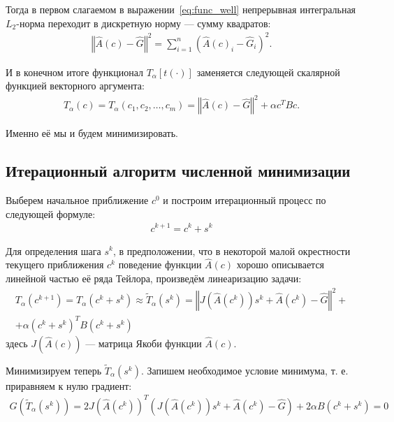 \documentclass[a4paper,14pt]{extarticle}
\newcommand{\norm}[1]{\left\Vert #1 \right\Vert}
\begin{document}
    Тогда в первом слагаемом в выражении~\eqref{eq:func_well} непрерывная интегральная $L_2$-норма переходит в дискретную норму --- сумму квадратов:
    \begin{gather*}
        \norm{\hat{A}(c) - \hat{G}}^2
        = \sum_{i = 1}^n \left(
        \hat{A}(c)_i
        - \hat{G}_i
        \right)^2.
    \end{gather*}

    И в конечном итоге функционал $T_{\alpha}[t(\cdot)]$ заменяется следующей скалярной функцией векторного аргумента:
    \begin{gather}
        \label{eq:func_discr}
        T_{\alpha}(c)
        = T_{\alpha}(c_1, c_2, \ldots, c_m)
        = \norm{\hat{A}(c) - \hat{G}}^2
        + \alpha  c^{T} B c.
    \end{gather}

    Именно её мы и будем минимизировать.

    \subsection{Итерационный алгоритм численной минимизации}

    Выберем начальное приближение $c^0$ и построим итерационный процесс по следующей формуле:
    \begin{gather*}
        c^{k+1} = c^{k} + s^{k}
    \end{gather*}

    Для определения шага $s^k$, в предположении, что в некоторой малой окрестности текущего приближения $c^k$ поведение функции $\hat{A}(c)$ хорошо описывается линейной частью её ряда Тейлора, произведём линеаризацию задачи:
    \begin{gather*}
        T_{\alpha}(c^{k+1})
        = T_{\alpha}(c^{k} + s^{k})
        \approx \widetilde{T}_{\alpha}(s^{k})
        = \norm{J(\hat{A}(c^k))s^{k} + \hat{A}(c^k) - \hat{G}}^2 + \\
        + \alpha  (c^k + s^{k})^{T} B (c^k + s^{k})
    \end{gather*}
    здесь $J(\hat{A}(c))$ --- матрица Якоби функции $\hat{A}(c)$.

    Минимизируем теперь $\widetilde{T}_{\alpha}(s^{k})$. Запишем необходимое условие минимума, т. е. приравняем к нулю градиент:
    \begin{gather*}
        G(\widetilde{T}_{\alpha}(s^{k}))
        = 2 J(\hat{A}(c^k))^T (J(\hat{A}(c^k))s^{k} + \hat{A}(c^k) - \hat{G})
        + 2 \alpha  B (c^k + s^{k})
        = 0
    \end{gather*}
\end{document}

